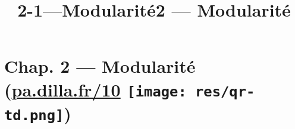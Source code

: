 \documentclass[a4paper,17pt]{extarticle}
\title{2-1---Modularité}
\begin{document}
    
    \title{2 --- Modularité}

    
    

    
    \hypertarget{chap.-2-modularituxe9-pa.dilla.fr10}{%
\section[Chap. 2 --- Modularité
(\href{https://pa.dilla.fr/10}{pa.dilla.fr/10} )]{\texorpdfstring{Chap.
2 --- Modularité (\href{https://pa.dilla.fr/10}{pa.dilla.fr/10}
\protect\texttt{[image: res/qr-td.png]})}{Chap. 2 --- Modularité (pa.dilla.fr/10 )}}\label{chap.-2-modularituxe9-pa.dilla.fr10}}
\end{document}
